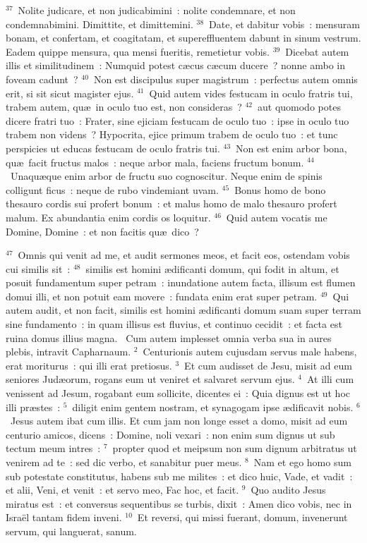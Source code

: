 ${}^{37}$~Nolite judicare, et non judicabimini~: nolite condemnare, et non condemnabimini. Dimittite, et dimittemini.
${}^{38}$~Date, et dabitur vobis~: mensuram bonam, et confertam, et coagitatam, et supereffluentem dabunt in sinum vestrum. Eadem quippe mensura, qua mensi fueritis, remetietur vobis.
${}^{39}$~Dicebat autem illis et similitudinem~: Numquid potest c\ae cus c\ae cum ducere~? nonne ambo in foveam cadunt~?
${}^{40}$~Non est discipulus super magistrum~: perfectus autem omnis erit, si sit sicut magister ejus.
${}^{41}$~Quid autem vides festucam in oculo fratris tui, trabem autem, qu\ae\ in oculo tuo est, non consideras~?
${}^{42}$~aut quomodo potes dicere fratri tuo~: Frater, sine ejiciam festucam de oculo tuo~: ipse in oculo tuo trabem non videns~? Hypocrita, ejice primum trabem de oculo tuo~: et tunc perspicies ut educas festucam de oculo fratris tui.
${}^{43}$~Non est enim arbor bona, qu\ae\ facit fructus malos~: neque arbor mala, faciens fructum bonum.
${}^{44}$~Unaqu\ae que enim arbor de fructu suo cognoscitur. Neque enim de spinis colligunt ficus~: neque de rubo vindemiant uvam.
${}^{45}$~Bonus homo de bono thesauro cordis sui profert bonum~: et malus homo de malo thesauro profert malum. Ex abundantia enim cordis os loquitur.
${}^{46}$~Quid autem vocatis me Domine, Domine~: et non facitis qu\ae\ dico~?


${}^{47}$~Omnis qui venit ad me, et audit sermones meos, et facit eos, ostendam vobis cui similis sit~:
${}^{48}$~similis est homini \ae dificanti domum, qui fodit in altum, et posuit fundamentum super petram~: inundatione autem facta, illisum est flumen domui illi, et non potuit eam movere~: fundata enim erat super petram.
${}^{49}$~Qui autem audit, et non facit, similis est homini \ae dificanti domum suam super terram sine fundamento~: in quam illisus est fluvius, et continuo cecidit~: et facta est ruina domus illius magna.
~Cum autem implesset omnia verba sua in aures plebis, intravit Capharnaum.
${}^{2}$~Centurionis autem cujusdam servus male habens, erat moriturus~: qui illi erat pretiosus.
${}^{3}$~Et cum audisset de Jesu, misit ad eum seniores Jud\ae orum, rogans eum ut veniret et salvaret servum ejus.
${}^{4}$~At illi cum venissent ad Jesum, rogabant eum sollicite, dicentes ei~: Quia dignus est ut hoc illi pr\ae stes~:
${}^{5}$~diligit enim gentem nostram, et synagogam ipse \ae dificavit nobis.
${}^{6}$~Jesus autem ibat cum illis. Et cum jam non longe esset a domo, misit ad eum centurio amicos, dicens~: Domine, noli vexari~: non enim sum dignus ut sub tectum meum intres~:
${}^{7}$~propter quod et meipsum non sum dignum arbitratus ut venirem ad te~: sed dic verbo, et sanabitur puer meus.
${}^{8}$~Nam et ego homo sum sub potestate constitutus, habens sub me milites~: et dico huic, Vade, et vadit~: et alii, Veni, et venit~: et servo meo, Fac hoc, et facit.
${}^{9}$~Quo audito Jesus miratus est~: et conversus sequentibus se turbis, dixit~: Amen dico vobis, nec in Isra\"el tantam fidem inveni.
${}^{10}$~Et reversi, qui missi fuerant, domum, invenerunt servum, qui languerat, sanum.


